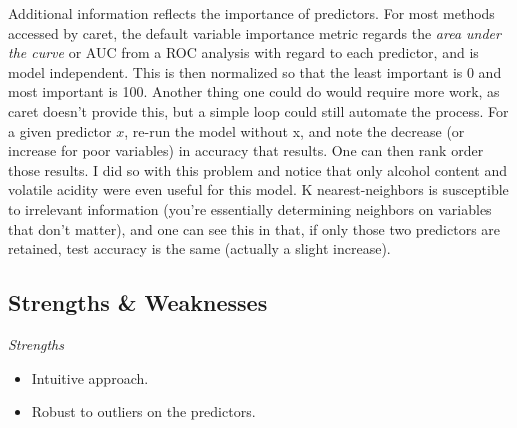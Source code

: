 \documentclass[english,nohyper,titlepage]{tufte-handout}\usepackage{knitr}
\begin{document}
Additional information reflects the importance of predictors. For most methods accessed by caret, the default variable importance metric regards the \emph{area under the curve} or AUC from a ROC analysis with regard to each predictor, and is model independent. This is then normalized so that the least important is 0 and most important is 100.  Another thing one could do would require more work, as caret doesn't provide this, but a simple loop could still automate the process.  For a given predictor $x$, re-run the model without x, and note the decrease (or increase for poor variables) in accuracy that results.  One can then rank order those results.  I did so with this problem and notice that only alcohol content and volatile acidity were even useful for this model.  K nearest-neighbors is susceptible to irrelevant information (you're essentially determining neighbors on variables that don't matter), and one can see this in that, if only those two predictors are retained, test accuracy is the same (actually a slight increase).

\begin{knitrout}\footnotesize
{}\color{fgcolor}\begin{kframe}
\begin{alltt}
\hlstd{(}
\end{alltt}
\end{kframe}
\end{knitrout}


\subsection{Strengths \& Weaknesses}
\emph{Strengths}
\begin{itemize}
  \item Intuitive approach.
  \item Robust to outliers on the predictors.
\end{itemize}
\end{document}
